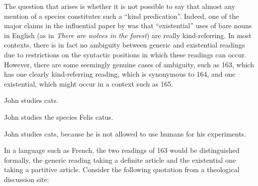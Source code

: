 \begin{styleBodyTextFirst}
The question that arises is whether it is not possible to say that almost any mention of a species constitutes such a “kind predication”. Indeed, one of the major claims in the influential paper by \citet{Carlson1977} was that “existential” uses of bare nouns in English (as in \textit{There are wolves in the forest}) are really kind-referring. In most contexts, there is in fact no ambiguity between generic and existential readings due to restrictions on the syntactic positions in which these readings can occur. However, there are some seemingly genuine cases of ambiguity, such as 163, which has one clearly kind-referring reading, which is synonymous to 164, and one existential, which might occur in a context such as 165.

\end{styleBodyTextFirst}

\begin{listWWNumileveli}
\item 

\begin{styleExample}
\label{bkm:Ref107049066}John studies cats.

\end{styleExample}

\item 

\begin{styleExample}
\label{bkm:Ref107049087}John studies the species Felis catus.

\end{styleExample}

\item 

\begin{styleExample}
\label{bkm:Ref107049114}John studies cats, because he is not allowed to use humans for his experiments. 

\end{styleExample}

\end{listWWNumileveli}

\begin{styleBodyTextFirst}
In a language such as French, the two readings of 163 would be distinguished formally, the generic reading taking a definite article and the existential one taking a partitive article. Consider the following quotation from a theological discussion site:

\end{styleBodyTextFirst}

